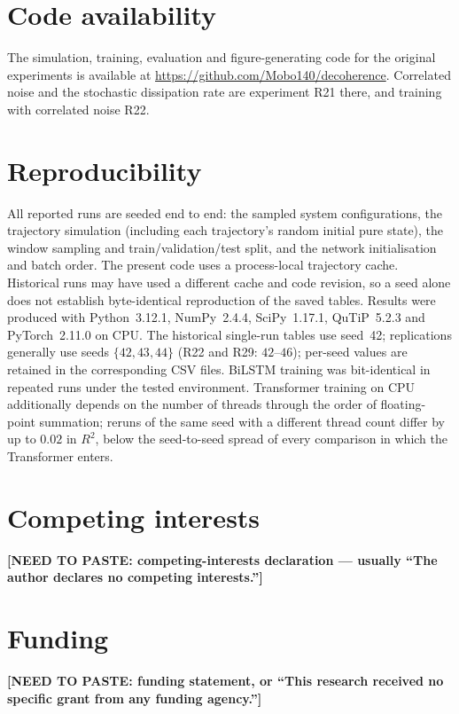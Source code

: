 \documentclass[twocolumn,10pt]{article}
\newcommand{\needspaste}[1]{{\color{red}\textbf{[NEED TO PASTE: #1]}}}
\begin{document}
\section*{Code availability}
The simulation, training, evaluation and figure-generating code for the
original experiments is available at
\url{https://github.com/Mobo140/decoherence}.
Correlated noise and the stochastic dissipation rate are experiment R21
there, and training with correlated noise R22.

\section*{Reproducibility}
All reported runs are seeded end to end: the sampled system
configurations, the trajectory simulation (including each trajectory's
random initial pure state), the window sampling and train/validation/test
split, and the network initialisation and batch order.
The present code uses a process-local trajectory cache. Historical runs
may have used a different cache and code revision, so a seed alone does not
establish byte-identical reproduction of the saved tables.
Results were produced with Python~3.12.1, NumPy~2.4.4, SciPy~1.17.1,
QuTiP~5.2.3 and PyTorch~2.11.0 on CPU.
The historical single-run tables use seed~42; replications generally use seeds
$\{42,43,44\}$ (R22 and R29: $42$--$46$); per-seed values are
retained in the corresponding CSV files.
BiLSTM training was bit-identical in repeated runs under the tested
environment. Transformer training on
CPU additionally depends on the number of threads through the order of
floating-point summation; reruns of the same seed with a different
thread count differ by up to $0.02$ in $R^2$, below the seed-to-seed
spread of every comparison in which the Transformer enters.

\section*{Competing interests}
\needspaste{competing-interests declaration --- usually ``The author
declares no competing interests.''}

\section*{Funding}
\needspaste{funding statement, or ``This research received no specific
grant from any funding agency.''}
\end{document}
